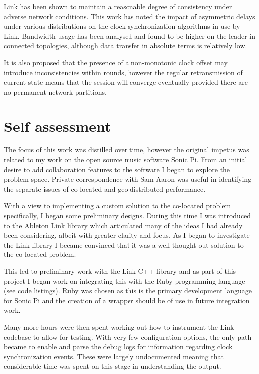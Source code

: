 \documentclass[11pt]{article} %
\theoremstyle{plain}
\theoremstyle{definition}
\begin{document}
Link has been shown to maintain a reasonable degree of consistency under
adverse network conditions. This work has noted the impact of asymmetric delays
under various distributions on the clock synchronization algorithms in use by
Link. Bandwidth usage has been analysed and found to be higher on the leader in
connected topologies, although data transfer in absolute terms is relatively
low.

It is also proposed that the presence of a non-monotonic clock offset may
introduce inconsistencies within rounds, however the regular retransmission of
current state means that the session will converge eventually provided there
are no permanent network partitions.




\appendix
\section{Self assessment}

The focus of this work was distilled over time, however the original impetus
was related to my work on the open source music software Sonic
Pi\cite{sonicpi}. From an initial desire to add collaboration features to the
software I began to explore the problem space. Private correspondence with Sam
Aaron was useful in identifying the separate issues of co-located and
geo-distributed performance.

With a view to implementing a custom solution to the co-located problem
specifically, I began some preliminary designs. During this time I was
introduced to the Ableton Link library which articulated many of the ideas I
had already been considering, albeit with greater clarity and focus. As I began
to investigate the Link library I became convinced that it was a well thought
out solution to the co-located problem.

This led to preliminary work with the Link C++ library and as part of this
project I began work on integrating this with the Ruby programming language
(see code listings). Ruby was chosen as this is the primary development
language for Sonic Pi and the creation of a wrapper should be of use in future
integration work.

Many more hours were then spent working out how to instrument the Link codebase
to allow for testing. With very few configuration options, the only path
became to enable and parse the debug logs for information regarding clock
synchronization events. These were largely undocumented meaning that
considerable time was spent on this stage in understanding the output.
\end{document}

